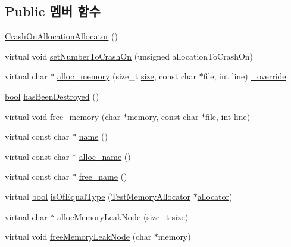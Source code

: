 \subsection*{Public 멤버 함수}
\begin{DoxyCompactItemize}
\item 
\hyperlink{class_crash_on_allocation_allocator_a1f14c7d9d71eaa1c3bfcbfde1ef773d4}{Crash\+On\+Allocation\+Allocator} ()
\item 
virtual void \hyperlink{class_crash_on_allocation_allocator_a58b38fa14a916934ff8664d04e725011}{set\+Number\+To\+Crash\+On} (unsigned allocation\+To\+Crash\+On)
\item 
virtual char $\ast$ \hyperlink{class_crash_on_allocation_allocator_a126f004b0a561fbedbba12273cfbbd61}{alloc\+\_\+memory} (size\+\_\+t \hyperlink{gst__avb__playbin_8c_a439227feff9d7f55384e8780cfc2eb82}{size}, const char $\ast$file, int line) \hyperlink{_cpp_u_test_config_8h_a049bea15dd750e15869863c94c1efc3b}{\+\_\+override}
\item 
\hyperlink{avb__gptp_8h_af6a258d8f3ee5206d682d799316314b1}{bool} \hyperlink{class_test_memory_allocator_ae26c82159ce24eb59770352585b402fd}{has\+Been\+Destroyed} ()
\item 
virtual void \hyperlink{class_test_memory_allocator_a529ac9813d3b0836ce0b964449942534}{free\+\_\+memory} (char $\ast$memory, const char $\ast$file, int line)
\item 
virtual const char $\ast$ \hyperlink{class_test_memory_allocator_a6a96605bec5749750a0b4be6e2d6e721}{name} ()
\item 
virtual const char $\ast$ \hyperlink{class_test_memory_allocator_afab6c44b5468c71a699c1efbd787e6e7}{alloc\+\_\+name} ()
\item 
virtual const char $\ast$ \hyperlink{class_test_memory_allocator_aac134aac79b30bc5903d0b2b7cc55b74}{free\+\_\+name} ()
\item 
virtual \hyperlink{avb__gptp_8h_af6a258d8f3ee5206d682d799316314b1}{bool} \hyperlink{class_test_memory_allocator_a3d6a5cc2f6b7a38b3f1d3e0567bf4f93}{is\+Of\+Equal\+Type} (\hyperlink{class_test_memory_allocator}{Test\+Memory\+Allocator} $\ast$\hyperlink{_memory_leak_warning_test_8cpp_a83fc2e9b9142613f7df2bcc3ff8292bc}{allocator})
\item 
virtual char $\ast$ \hyperlink{class_test_memory_allocator_a1a786ad58b46528e82235a14fa667c1d}{alloc\+Memory\+Leak\+Node} (size\+\_\+t \hyperlink{gst__avb__playbin_8c_a439227feff9d7f55384e8780cfc2eb82}{size})
\item 
virtual void \hyperlink{class_test_memory_allocator_a10f2958f3b7378256e933896ccc93df0}{free\+Memory\+Leak\+Node} (char $\ast$memory)
\end{DoxyCompactItemize}
